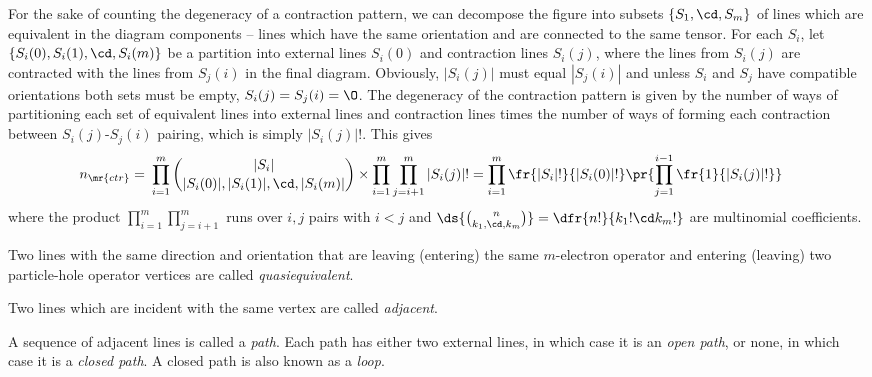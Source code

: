 \documentclass[11pt,fleqn]{article}
\numberwithin{equation}{section}
\begin{document}
\begin{drv}
For the sake of counting the degeneracy of a contraction pattern, we can decompose the figure into subsets $\{S_1,\cd,S_m\}$ of lines which are equivalent in the diagram components -- lines which have the same orientation and are connected to the same tensor.
For each $S_i$, let $\{S_i(0),S_i(1),\cd,S_i(m)\}$ be a partition into external lines $S_i(0)$ and contraction lines $S_i(j)$, where the lines from $S_i(j)$ are contracted with the lines from $S_j(i)$ in the final diagram.
Obviously, $|S_i(j)|$ must equal $|S_j(i)|$ and unless $S_i$ and $S_j$ have compatible orientations both sets must be empty, $S_i(j)=S_j(i)=\O$.
The degeneracy of the contraction pattern is given by the number of ways of partitioning each set of equivalent lines into external lines and contraction lines times the number of ways of forming each contraction between $S_i(j)$-$S_j(i)$ pairing, which is simply $|S_i(j)|!$.
This gives
\begin{align*}
  n_{\mr{ctr}}
=&\
  \prod_{i=1}^m
  {|S_i| \choose |S_i(0)|, |S_i(1)|,\cd, |S_i(m)|}
  \times
  \prod_{i=1}^m
  \prod_{j=i+1}^m
  |S_i(j)|!
=
  \prod_{i=1}^m
  \fr{|S_i|!}{|S_i(0)|!}
  \pr{
    \prod_{j=1}^{i-1}
    \fr{1}{|S_i(j)|!}
  }
\end{align*}
where the product $\prod_{i=1}^m\prod_{j=i+1}^m$ runs over $i,j$ pairs with $i<j$ and  $\ds{{n\choose k_1,\cd,k_m}}=\dfr{n!}{k_1!\cd k_m!}$ are multinomial coefficients.
\end{drv}

\begin{dfn}
Two lines with the same direction and orientation that are leaving (entering) the same $m$-electron operator and entering (leaving) two particle-hole operator vertices are called \textit{quasiequivalent}.
\end{dfn}



\begin{dfn}
Two lines which are incident with the same vertex are called \textit{adjacent}.
\end{dfn}

\begin{dfn}
A sequence of adjacent lines is called a \textit{path}.
Each path has either two external lines, in which case it is an \textit{open path}, or none, in which case it is a \textit{closed path}.
A closed path is also known as a \textit{loop}.
\end{dfn}
\end{document}

